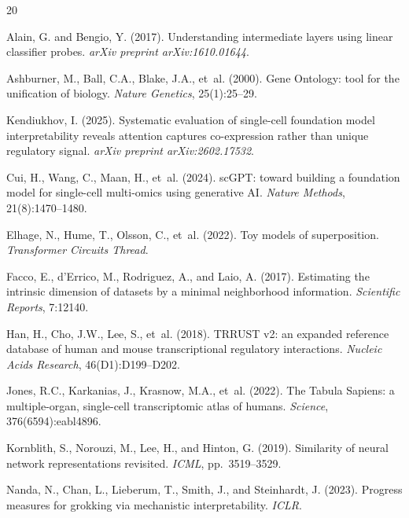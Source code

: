 \documentclass[10pt,twocolumn]{article}
\begin{document}
\begin{thebibliography}{20}

Alain, G. and Bengio, Y. (2017).
Understanding intermediate layers using linear classifier probes.
\textit{arXiv preprint arXiv:1610.01644}.

Ashburner, M., Ball, C.A., Blake, J.A., et~al. (2000).
Gene Ontology: tool for the unification of biology.
\textit{Nature Genetics}, 25(1):25--29.

Kendiukhov, I. (2025).
Systematic evaluation of single-cell foundation model interpretability reveals attention captures co-expression rather than unique regulatory signal.
\textit{arXiv preprint arXiv:2602.17532}.

Cui, H., Wang, C., Maan, H., et~al. (2024).
scGPT: toward building a foundation model for single-cell multi-omics using generative AI.
\textit{Nature Methods}, 21(8):1470--1480.

Elhage, N., Hume, T., Olsson, C., et~al. (2022).
Toy models of superposition.
\textit{Transformer Circuits Thread}.

Facco, E., d'Errico, M., Rodriguez, A., and Laio, A. (2017).
Estimating the intrinsic dimension of datasets by a minimal neighborhood information.
\textit{Scientific Reports}, 7:12140.

Han, H., Cho, J.W., Lee, S., et~al. (2018).
TRRUST v2: an expanded reference database of human and mouse transcriptional regulatory interactions.
\textit{Nucleic Acids Research}, 46(D1):D199--D202.

Jones, R.C., Karkanias, J., Krasnow, M.A., et~al. (2022).
The Tabula Sapiens: a multiple-organ, single-cell transcriptomic atlas of humans.
\textit{Science}, 376(6594):eabl4896.

Kornblith, S., Norouzi, M., Lee, H., and Hinton, G. (2019).
Similarity of neural network representations revisited.
\textit{ICML}, pp.\ 3519--3529.

Nanda, N., Chan, L., Lieberum, T., Smith, J., and Steinhardt, J. (2023).
Progress measures for grokking via mechanistic interpretability.
\textit{ICLR}.


\end{thebibliography}
\end{document}
